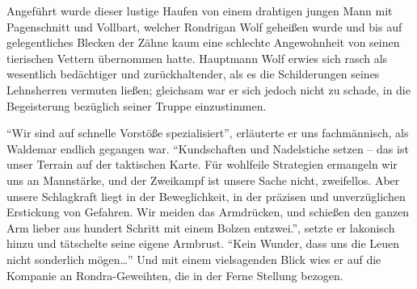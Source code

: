 Angeführt wurde dieser lustige Haufen von einem drahtigen jungen Mann mit Pagenschnitt und Vollbart, welcher Rondrigan Wolf geheißen wurde und bis auf gelegentliches Blecken der Zähne kaum eine schlechte Angewohnheit von seinen tierischen Vettern übernommen hatte. Hauptmann Wolf erwies sich rasch als wesentlich bedächtiger und zurückhaltender, als es die Schilderungen seines Lehnsherren vermuten ließen; gleichsam war er sich jedoch nicht zu schade, in die Begeisterung bezüglich seiner Truppe einzustimmen.

``Wir sind auf schnelle Vorstöße spezialisiert'', erläuterte er uns fachmännisch, als Waldemar endlich gegangen war. ``Kundschaften und Nadelstiche setzen -- das ist unser Terrain auf der taktischen Karte. Für wohlfeile Strategien ermangeln wir uns an Mannstärke, und der Zweikampf ist unsere Sache nicht, zweifellos. Aber unsere Schlagkraft liegt in der Beweglichkeit, in der präzisen und unverzüglichen Erstickung von Gefahren. Wir meiden das Armdrücken, und schießen den ganzen Arm lieber aus hundert Schritt mit einem Bolzen entzwei.'', setzte er lakonisch hinzu und tätschelte seine eigene Armbrust. ``Kein Wunder, dass uns die Leuen nicht sonderlich mögen\dots'' Und mit einem vielsagenden Blick wies er auf die Kompanie an Rondra-Geweihten, die in der Ferne Stellung bezogen.

